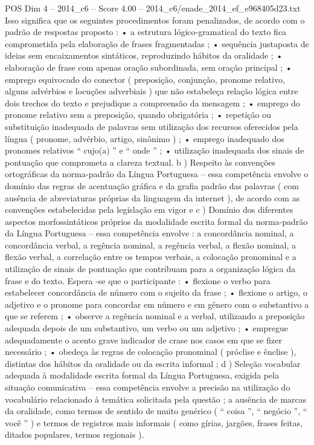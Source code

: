 \begin{textsample}{POS Dim 4 – 2014\_c6 – Score 4.00 – 2014\_c6/enade\_2014\_ef\_e968405d23.txt}
Isso significa que os seguintes procedimentos foram penalizados, de acordo com o padrão de respostas proposto : • a estrutura lógico-gramatical do texto fica comprometida pela elaboração de frases fragmentadas ; • sequência justaposta de ideias sem encaixamentos sintáticos, reproduzindo hábitos da oralidade ; • elaboração de frase com apenas oração subordinada, sem oração principal ; • emprego equivocado do conector ( preposição, conjunção, pronome relativo, alguns advérbios e locuções adverbiais ) que não estabeleça relação lógica entre dois trechos do texto e prejudique a compreensão da mensagem ; • emprego do pronome relativo sem a preposição, quando obrigatória ; • repetição ou substituição inadequada de palavras sem utilização dos recursos oferecidos pela língua ( pronome, advérbio, artigo, sinônimo ) ; • emprego inadequado dos pronomes relativos “ cujo(a) ” e “ onde ” ; • utilização inadequada dos sinais de pontuação que comprometa a clareza textual. b ) Respeito às convenções ortográficas da norma-padrão da Língua Portuguesa – essa competência envolve o domínio das regras de acentuação gráfica e da grafia padrão das palavras ( com ausência de abreviaturas próprias da linguagem da internet ), de acordo com as convenções estabelecidas pela legislação em vigor e c ) Domínio dos diferentes aspectos morfossintáticos próprios da modalidade escrita formal da norma-padrão da Língua Portuguesa – essa competência envolve : a concordância nominal, a concordância verbal, a regência nominal, a regência verbal, a flexão nominal, a flexão verbal, a correlação entre os tempos verbais, a colocação pronominal e a utilização de sinais de pontuação que contribuam para a organização lógica da frase e do texto.
Espera -se que o participante : • flexione o verbo para estabelecer concordância de número com o sujeito da frase ; • flexione o artigo, o adjetivo e o pronome para concordar em número e em gênero com o substantivo a que se referem ; • observe a regência nominal e a verbal, utilizando a preposição adequada depois de um substantivo, um verbo ou um adjetivo ; • empregue adequadamente o acento grave indicador de crase nos casos em que se fizer necessário ; • obedeça às regras de colocação pronominal ( próclise e ênclise ), distintas dos hábitos da oralidade ou da escrita informal ; d ) Seleção vocabular adequada à modalidade escrita formal da Língua Portuguesa, exigida pela situação comunicativa – essa competência envolve a precisão na utilização do vocabulário relacionado à temática solicitada pela questão ; a ausência de marcas da oralidade, como termos de sentido de muito genérico ( “ coisa ”, “ negócio ”, “ você ” ) e termos de registros mais informais ( como gírias, jargões, frases feitas, ditados populares, termos regionais ).

\end{textsample}
